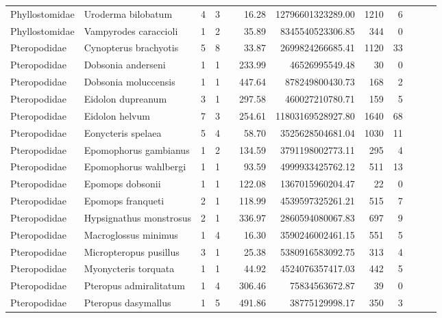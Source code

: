 \begin{landscape}
\begin{longtable}{@{}llrrrrrrrrrr@{}}
  Phyllostomidae & Uroderma bilobatum &   4 &   3 &  & 16.28 & 12796601323289.00 & 1210 &   6 &  &  &  \\ 
  Phyllostomidae & Vampyrodes caraccioli &   1 &   2 &  & 35.89 & 8345540523306.85 & 344 &   0 &  &  &  \\ 
  Pteropodidae & Cynopterus brachyotis &   5 &   8 &  & 33.87 & 2699824266685.41 & 1120 &  33 &  &  &  \\ 
  Pteropodidae & Dobsonia anderseni &   1 &   1 &  & 233.99 & 46526995549.48 &  30 &   0 &  &  &  \\ 
  Pteropodidae & Dobsonia moluccensis &   1 &   1 &  & 447.64 & 878249800430.73 & 168 &   2 &  &  &  \\ 
  Pteropodidae & Eidolon dupreanum &   3 &   1 &  & 297.58 & 460027210780.71 & 159 &   5 &  &  &  \\ 
  Pteropodidae & Eidolon helvum &   7 &   3 &  & 254.61 & 11803169528927.80 & 1640 &  68 &  &  &  \\ 
  Pteropodidae & Eonycteris spelaea &   5 &   4 &  & 58.70 & 3525628504681.04 & 1030 &  11 &  &  &  \\ 
  Pteropodidae & Epomophorus gambianus &   1 &   2 &  & 134.59 & 3791198002773.11 & 295 &   4 &  &  &  \\ 
  Pteropodidae & Epomophorus wahlbergi &   1 &   1 &  & 93.59 & 4999933425762.12 & 511 &  13 &  &  &  \\ 
  Pteropodidae & Epomops dobsonii &   1 &   1 &  & 122.08 & 1367015960204.47 &  22 &   0 &  &  &  \\ 
  Pteropodidae & Epomops franqueti &   2 &   1 &  & 118.99 & 4539597325261.21 & 515 &   7 &  &  &  \\ 
  Pteropodidae & Hypsignathus monstrosus &   2 &   1 &  & 336.97 & 2860594080067.83 & 697 &   9 &  &  &  \\ 
  Pteropodidae & Macroglossus minimus &   1 &   4 &  & 16.30 & 3590246002461.15 & 551 &   5 &  &  &  \\ 
  Pteropodidae & Micropteropus pusillus &   3 &   1 &  & 25.38 & 5380916583092.75 & 313 &   4 &  &  &  \\ 
  Pteropodidae & Myonycteris torquata &   1 &   1 &  & 44.92 & 4524076357417.03 & 442 &   5 &  &  &  \\ 
  Pteropodidae & Pteropus admiralitatum &   1 &   4 &  & 306.46 & 75834563672.87 &  39 &   0 &  &  &  \\ 
  Pteropodidae & Pteropus dasymallus &   1 &   5 &  & 491.86 & 38775129998.17 & 350 &   3 &  &  &  \\ 

\end{longtable}
\end{landscape}
